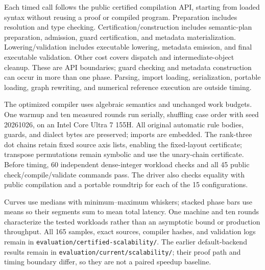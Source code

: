 Each timed call follows the public certified compilation API, starting from
loaded syntax without reusing a proof or compiled program. Preparation
includes resolution and type checking. Certification/construction includes
semantic-plan preparation, admission, guard certification, and metadata
materialization. Lowering/validation includes executable lowering, metadata
emission, and final executable validation. Other cost covers dispatch and
intermediate-object cleanup. These are API boundaries; guard checking and
metadata construction can occur in more than one phase. Parsing, import
loading, serialization, portable loading, graph rewriting, and numerical
reference execution are outside timing.

The optimized compiler uses algebraic semantics and unchanged work budgets.
One warmup and ten measured rounds run serially, shuffling case order with
seed 20261026, on an Intel Core Ultra 7 155H. All original automatic rule
bodies, guards, and dialect bytes are preserved; imports are embedded.
The rank-three dot chains retain fixed source axis lists, enabling the
fixed-layout certificate; transpose permutations remain symbolic and use
the unary-chain certificate. Before timing, 60 independent dense-integer
workload checks and all 45 public check/compile/validate commands pass.
The driver also checks equality with public compilation and a portable
roundtrip for each of the 15 configurations.

Curves use medians with minimum--maximum whiskers; stacked phase bars use
means so their segments sum to mean total latency. One machine and ten
rounds characterize the tested workloads rather than an asymptotic bound
or production throughput. All 165 samples, exact sources, compiler hashes,
and validation logs remain in
\nolinkurl{evaluation/certified-scalability/}. The earlier default-backend
results remain in \nolinkurl{evaluation/current/scalability/}; their proof
path and timing boundary differ, so they are not a paired speedup baseline.
